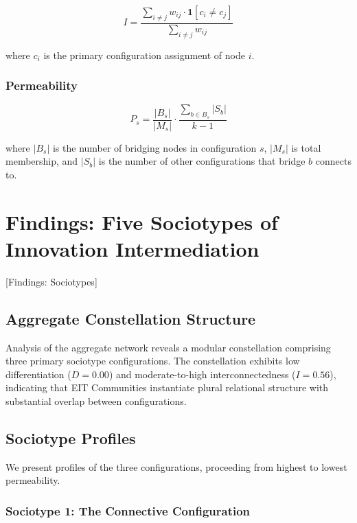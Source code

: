 \documentclass[../main.tex]{subfiles}
\begin{document}
\begin{equation}
    I = \frac{\sum_{i \neq j} w_{ij} \cdot \mathbf{1}[c_i \neq c_j]}{\sum_{i \neq j} w_{ij}}
\end{equation}

where $c_i$ is the primary configuration assignment of node $i$.

\subsubsection{Permeability}

\begin{equation}
    P_s = \frac{|B_s|}{|M_s|} \cdot \frac{\sum_{b \in B_s} |S_b|}{k - 1}
\end{equation}

where $|B_s|$ is the number of bridging nodes in configuration $s$, $|M_s|$ is total membership, and $|S_b|$ is the number of other configurations that bridge $b$ connects to.


\section{Findings: Five Sociotypes of Innovation Intermediation}[Findings: Sociotypes]

\subsection{Aggregate Constellation Structure}

Analysis of the aggregate network reveals a modular constellation comprising three primary sociotype configurations. The constellation exhibits low differentiation ($D = 0.00$) and moderate-to-high interconnectedness ($I = 0.56$), indicating that EIT Communities instantiate plural relational structure with substantial overlap between configurations.

\subsection{Sociotype Profiles}

We present profiles of the three configurations, proceeding from highest to lowest permeability.

\subsubsection{Sociotype 1: The Connective Configuration}
\end{document}
